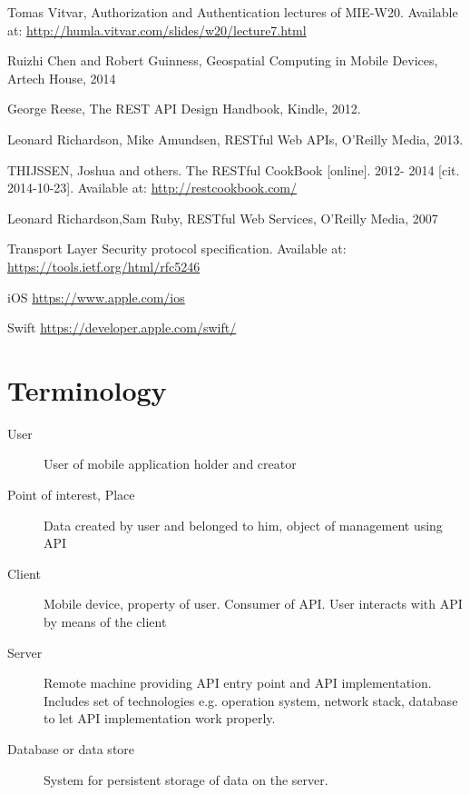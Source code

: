 \documentclass[thesis=M,english]{FITthesis}[2012/10/20]
\begin{document}
\begin{thebibliography}{9}


  Tomas Vitvar, Authorization and Authentication lectures of MIE-W20. Available at: \url{http://humla.vitvar.com/slides/w20/lecture7.html}

  Ruizhi Chen and Robert Guinness,
  Geospatial Computing in Mobile Devices,
  Artech House,
  2014

  George Reese,
  The REST API Design Handbook,
  Kindle,
  2012.

  Leonard Richardson,
  Mike Amundsen,
  RESTful Web APIs,
  O'Reilly Media,
  2013.

  THIJSSEN, Joshua and others. The RESTful CookBook [online]. 2012- 2014 [cit. 2014-10-23]. Available at: \url{http://restcookbook.com/}

  Leonard Richardson,Sam Ruby,
  RESTful Web Services,
  O'Reilly Media,
  2007

  Transport Layer Security protocol specification. Available at:  \url{https://tools.ietf.org/html/rfc5246}

  iOS \url{https://www.apple.com/ios}

  Swift \url{https://developer.apple.com/swift/}



\end{thebibliography}

%
%

\appendix

\chapter{Terminology}
\begin{description}
	\item[User] User of mobile application holder and creator
	\item[Point of interest, Place] Data created by user and belonged to him, object of management using API
	\item[Client] Mobile device, property of user. Consumer of API. User interacts with API by means of the client
	\item[Server] Remote machine providing API entry point and API implementation. Includes set of technologies e.g. operation system, network stack, database to let API implementation work properly.
	\item[Database or data store] System for persistent storage of data on the server.
\end{description}
\end{document}

